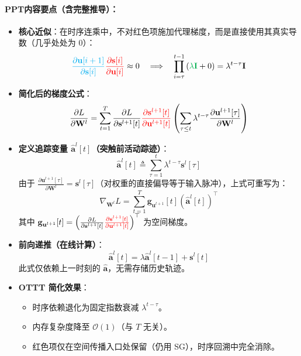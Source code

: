 \documentclass[journal,12pt,onecolumn]{IEEEtran}
\begin{document}
\paragraph{\textbf{PPT内容要点（含完整推导）：}}
\begin{itemize}
    \item \textbf{核心近似}：在时序连乘中，不对红色项施加代理梯度，而是直接使用其真实导数（几乎处处为 0）：
    \[
    {\color{cyan}{\frac{\partial \mathbf{u}[i+1]}{\partial \mathbf{s}[i]}}}
    {\color{red}{\frac{\partial \mathbf{s}[i]}{\partial \mathbf{u}[i]}}}
    \approx 0
    \quad\Longrightarrow\quad
    \prod_{i=\tau}^{t-1}
    \left(
    {\color[rgb]{0,0.69,0.31}{\lambda \mathbf{I}}} + 0
    \right)
    = \lambda^{t-\tau} \mathbf{I}
    \]
    
    \item \textbf{简化后的梯度公式}\cite{xiao_online_2022}：
    \[
    \frac{\partial L}{\partial \mathbf{W}^l}
    =
    \sum_{t=1}^T
    \frac{\partial L}{\partial \mathbf{s}^{l+1}[t]}
    {\color{red}{\frac{\partial \mathbf{s}^{l+1}[t]}{\partial \mathbf{u}^{l+1}[t]}}}
    \left(
    \sum_{\tau \leq t} \lambda^{t-\tau}
    \frac{\partial \mathbf{u}^{l+1}[\tau]}{\partial \mathbf{W}^l}
    \right)
    \]
    
    \item \textbf{定义追踪变量 \(\hat{\mathbf{a}}^l[t]\)（突触前活动踪迹）}：
    \[
    \boxed{
    \hat{\mathbf{a}}^l[t] \triangleq \sum_{\tau=1}^{t} \lambda^{t-\tau} \mathbf{s}^l[\tau]
    }
    \]
    由于 \(\frac{\partial \mathbf{u}^{l+1}[\tau]}{\partial \mathbf{W}^l} = \mathbf{s}^l[\tau]\)（对权重的直接偏导等于输入脉冲），上式可重写为：
    \[
    \nabla_{\mathbf{W}^l}L = \sum_{t=1}^T \mathbf{g}_{\mathbf{u}^{l+1}}[t] \left(\hat{\mathbf{a}}^l[t]\right)^\top
    \]
    其中 \(\mathbf{g}_{\mathbf{u}^{l+1}}[t] = \left( \frac{\partial L}{\partial \mathbf{s}^{l+1}[t]} {\color{red}{\frac{\partial \mathbf{s}^{l+1}[t]}{\partial \mathbf{u}^{l+1}[t]}}} \right)^\top\) 为空间梯度。
    
    \item \textbf{前向递推（在线计算）}：
    \[
    \boxed{
    \hat{\mathbf{a}}^l[t] = \lambda \hat{\mathbf{a}}^l[t-1] + \mathbf{s}^l[t]
    }
    \]
    此式仅依赖上一时刻的 \(\hat{\mathbf{a}}\)，无需存储历史轨迹。
    
    \item \textbf{OTTT 简化效果}：
    \begin{itemize}
        \item 时序依赖退化为固定指数衰减 \(\lambda^{t-\tau}\)。
        \item 内存复杂度降至 \(\mathcal{O}(1)\)（与 \(T\) 无关）。
        \item 红色项仅在空间传播入口处保留（仍用 SG），时序回溯中完全消除。
    \end{itemize}
\end{itemize}
\end{document}
